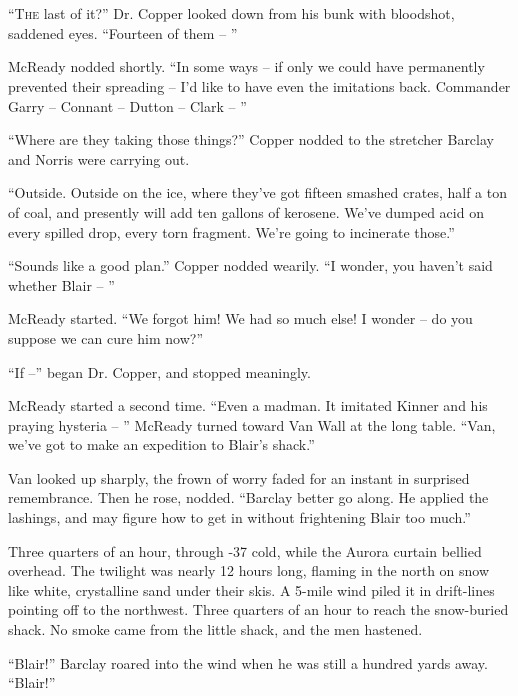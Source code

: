 \documentclass[letterpaper,openany,12pt]{memoir}		%
\begin{document}
\chapter[Chapter 12]{}

\lettrine[lines=3,findent=3pt,nindent=2pt]{``T}{he} last of it?'' Dr. Copper
looked down from his bunk with bloodshot, saddened eyes. ``Fourteen of them --
''

McReady nodded shortly. ``In some ways -- if only we could have permanently
prevented their spreading -- I'd like to have even the imitations back.
Commander Garry -- Connant -- Dutton -- Clark -- ''

``Where are they taking those things?'' Copper nodded to the stretcher Barclay
and Norris were carrying out.

``Outside. Outside on the ice, where they've got fifteen smashed crates, half a
ton of coal, and presently will add ten gallons of kerosene. We've dumped acid
on every spilled drop, every torn fragment. We're going to incinerate those.''

``Sounds like a good plan.'' Copper nodded wearily. ``I wonder, you haven't said
whether Blair -- ''

McReady started. ``We forgot him! We had so much else! I wonder -- do you
suppose we can cure him now?''

``If --'' began Dr. Copper, and stopped meaningly.

McReady started a second time. ``Even a madman. It imitated Kinner and his
praying hysteria -- '' McReady turned toward Van Wall at the long table. ``Van,
we've got to make an expedition to Blair's shack.''

Van looked up sharply, the frown of worry faded for an instant in surprised
remembrance. Then he rose, nodded. ``Barclay better go along. He applied the
lashings, and may figure how to get in without frightening Blair too much.''

Three quarters of an hour, through -37 cold, while the Aurora curtain bellied
overhead. The twilight was nearly 12 hours long, flaming in the north on snow
like white, crystalline sand under their skis. A 5-mile wind piled it in
drift-lines pointing off to the northwest. Three quarters of an hour to reach
the snow-buried shack. No smoke came from the little shack, and the men
hastened.

``Blair!'' Barclay roared into the wind when he was still a hundred yards away.
``Blair!''
\end{document}
